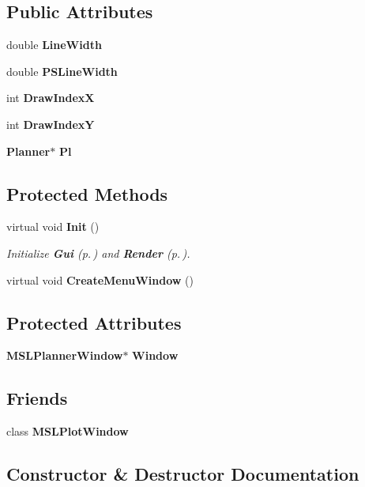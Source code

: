 \subsection*{Public Attributes}
\begin{CompactItemize}
\item 
double {\bf Line\-Width}
\item 
double {\bf PSLine\-Width}
\item 
int {\bf Draw\-Index\-X}
\item 
int {\bf Draw\-Index\-Y}
\item 
{\bf Planner}$\ast$ {\bf Pl}
\end{CompactItemize}
\subsection*{Protected Methods}
\begin{CompactItemize}
\item 
virtual void {\bf Init} ()
\begin{CompactList}\small\item\em Initialize {\bf Gui} {\rm (p.\,\pageref{class_Gui})} and {\bf Render} {\rm (p.\,\pageref{class_Render})}.\item\end{CompactList}\item 
virtual void {\bf Create\-Menu\-Window} ()
\end{CompactItemize}
\subsection*{Protected Attributes}
\begin{CompactItemize}
\item 
{\bf MSLPlanner\-Window}$\ast$ {\bf Window}
\end{CompactItemize}
\subsection*{Friends}
\begin{CompactItemize}
\item 
class {\bf MSLPlot\-Window}
\end{CompactItemize}


\subsection{Constructor \& Destructor Documentation}
